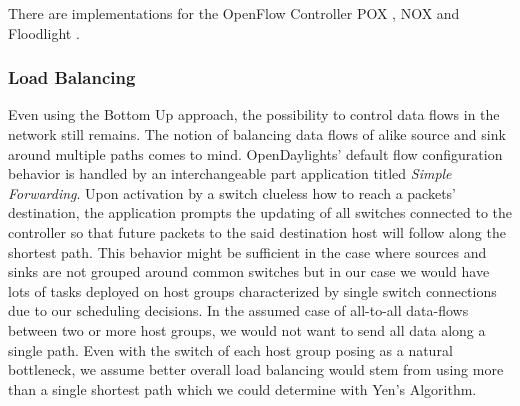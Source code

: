 There are implementations for the OpenFlow Controller POX \cite{opennetmon}, NOX \cite{opentm} and
Floodlight \cite {flowsense}.

\subsubsection{Load Balancing}
Even using the Bottom Up approach, the possibility to control data flows in the network still
remains. The notion of balancing data flows of alike source and sink around multiple paths comes to
mind. OpenDaylights' default flow configuration behavior is handled by an interchangeable part
application titled \textit{Simple Forwarding}. Upon activation by a switch clueless how to reach a
packets' destination, the application prompts the updating of all switches connected to the
controller so that future packets to the said destination host will follow along the shortest path.
This behavior might be sufficient in the case where sources and sinks are not grouped around common
switches but in our case we would have lots of tasks deployed on host groups characterized by single
switch connections due to our scheduling decisions. In the assumed case of all-to-all data-flows
between two or more host groups, we would not want to send all data along a single path. Even with
the switch of each host group posing as a natural bottleneck, we assume better overall load
balancing would stem from using more than a single shortest path which we could determine with Yen's
Algorithm.

